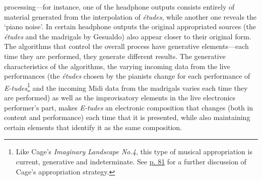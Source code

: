 processing---for instance, one of the headphone outputs consists entirely of material generated from the interpolation of \emph{\'{e}tudes}, while another one reveals the `piano noise'. In certain headphone outputs the original appropriated sources (the \emph{\'{e}tudes} and the madrigals by Gesualdo) also appear closer to their original form. The algorithms that control the overall process have generative elements---each time they are performed, they generate different results. The generative characteristics of the algorithms, the varying incoming data from the live performances (the \emph{\'{e}tudes} chosen by the pianists change for each performance of \emph{E-tudes}\footnote{Like Cage's \emph{Imaginary Landscape No.4}, this type of musical appropriation is current, generative and indeterminate. See \hyperlink{landscape4}{p. 81} for a further discussion of Cage's appropriation strategy.} and the incoming Midi data from the madrigals varies each time they are performed) as well as the improvisatory elements in the live electronics performer's part, makes \mbox{\emph{E-tudes}} an electronic composition that changes (both in content and performance) each time that it is presented, while also maintaining certain elements that identify it as the same composition.


